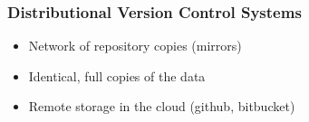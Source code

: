 %
%
%

\begin{frame}[c]\frametitle{Distributional Version Control Systems}
    \begin{itemize}
        \item Network of repository copies (mirrors)
        \item Identical, full copies of the data
        \item Remote storage in the cloud (github, bitbucket)
    \end{itemize}        
\end{frame}

